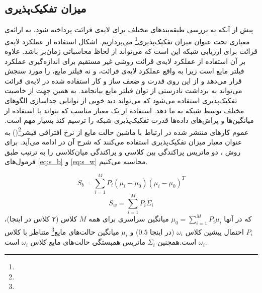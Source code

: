 \subsection{میزان تفکیک‌پذیری}
پیش از آنکه به بررسی طبقه‌بندهای مختلف برای لایه‌ی قرائت پرداخته شود، به ارائه‌ی معیاری تحت عنوان میزان تفکیک‌پذیری\footnote{} می‌پردازیم. اشکال استفاده از عملکرد لایه‌ی قرائت برای ارزیابی شبکه این است که می‌تواند از لحاظ محاسباتی زمان‌بر باشد. علاوه بر آن استفاده از عملکرد لایه‌ی قرائت روشی غیر مستقیم برای اندازه‌گیری عملکرد فیلتر مایع است زیرا به واقع عملکرد لایه‌ی قرائت، و نه فیلتر مایع، را مورد سنجش قرار می‌دهد و از این روی قدرت و ضعف ساز و کار استفاده شده در لایه‌ی قرائت می‌تواند به برداشت نادرستی از توان فیلتر مایع بیانجامد. به همین جهت از خاصیت تفکیک‌پذیری استفاده می‌شود که می‌تواند دید خوبی از توانایی جداسازی الگوهای مختلف توسط شبکه به ما دهد. استفاده از یک معیار مناسب که بتواند با استفاده از میانگین‌ها و پراش‌های داده‌ها قدرت تفکیک‌پذیری شبکه را ترسیم کند بسیار مهم است. عموم کارهای منتشر شده در ارتباط با ماشین حالت مایع از نرخ افتراقی فیشر\footnote{}()\cite{fisher1936use} به عنوان معیار میزان تفکیک‌پذیری استفاده می‌کنند\cite{hourdakis2011improving,ju2013effects} که شرح آن در ادامه می‌آید. برای روش ، دو ماتریس پراکندگی بین کلاسی و پراکندگی میان‌کلاسی را به ترتیب طبق فرمول‌های \ref{eq:s_b} و \ref{eq:s_w} محاسبه می‌کنیم.

\begin{equation}\label{eq:s_b}
S_b = \sum_{i=1}^{M}P_i(\mu_i-\mu_0)(\mu_i-\mu_0)^T
\end{equation} 
\begin{equation}\label{eq:s_w}
S_w = \sum_{i=1}^{M}P_i\Sigma _i
\end{equation} 
که در آنها $\mu_0 = \sum_{i=1}^{M}P_i\mu_i$ میانگین سراسری برای همه $M$ کلاس (۲ کلاس در اینجا)، $P_i$ احتمال پیشین کلاس $\omega_i$ (در اینجا $0.5$) و $\mu_i$ میانگین حالت‌های مایع\footnote{} متناظر با کلاس $\omega_i$ است.همچنین $\Sigma _i$  ماتریس همبستگی حالت‌های مایع کلاس $\omega_i$ است.

